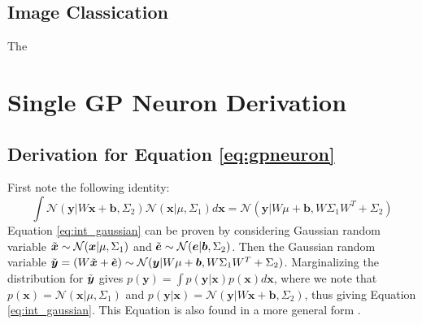 \documentclass{article}
\begin{document}
\subsection{Image Classication}
The





\appendix

\section{Single GP Neuron Derivation}
\subsection{Derivation for Equation \ref{eq:gpneuron}}
\label{apd:singleGPNeuron}

First note the following identity:
\begin{equation}
    \int\mathcal{N}(\boldsymbol{y}|W\boldsymbol{x}+\boldsymbol{b},\Sigma_2)\mathcal{N}(\boldsymbol{x}|\mu,\Sigma_1)d\boldsymbol{x}=\mathcal{N}(\boldsymbol{y}|W\mu+\boldsymbol{b},W\Sigma_1W^T+\Sigma_2)
    \label{eq:int_gaussian}
\end{equation}
Equation \ref{eq:int_gaussian} can be proven by considering Gaussian random variable $\Tilde{\boldsymbol{x}}\sim\mathcal{N}(\boldsymbol{x}|\mu,\Sigma_1)$ and $\Tilde{\boldsymbol{e}}\sim\mathcal{N}(\boldsymbol{e}|\boldsymbol{b},\Sigma_2)$. Then the Gaussian random variable $\Tilde{\boldsymbol{y}}=(W\Tilde{\boldsymbol{x}}+\Tilde{\boldsymbol{e}})\sim\mathcal{N}(\boldsymbol{y}|W\mu+\boldsymbol{b},W\Sigma_1W^T+\Sigma_2)$. Marginalizing the distribution for $\Tilde{\boldsymbol{y}}$ gives $p(\boldsymbol{y})=\int p(\boldsymbol{y}|\boldsymbol{x})p(\boldsymbol{x})d\boldsymbol{x}$, where we note that $p(\boldsymbol{x})=\mathcal{N}(\boldsymbol{x}|\mu,\Sigma_1)$ and $p(\boldsymbol{y}|\boldsymbol{x})=\mathcal{N}(\boldsymbol{y}|W\boldsymbol{x}+\boldsymbol{b},\Sigma_2)$, thus giving Equation \ref{eq:int_gaussian}. This Equation is also found in a more general form \cite{MatrixCookBook}.
\end{document}
